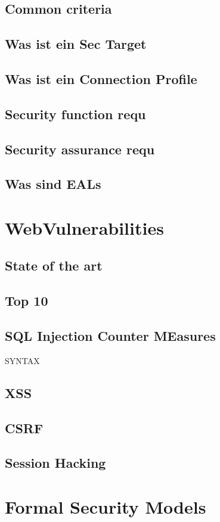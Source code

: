 \documentclass[a4paper, 12pt]{article}
\begin{document}
\subsection{Common criteria}
\subsection{Was ist ein Sec Target}
\subsection{Was ist ein Connection Profile}
\subsection{Security function requ}
\subsection{Security assurance requ}
\subsection{Was sind EALs}


\section{WebVulnerabilities}
\subsection{State of the art}
\subsection{Top 10}
\subsection{SQL Injection Counter MEasures}
SYNTAX
\subsection{XSS}
\subsection{CSRF}
\subsection{Session Hacking}

\section{Formal Security Models}
\end{document}

